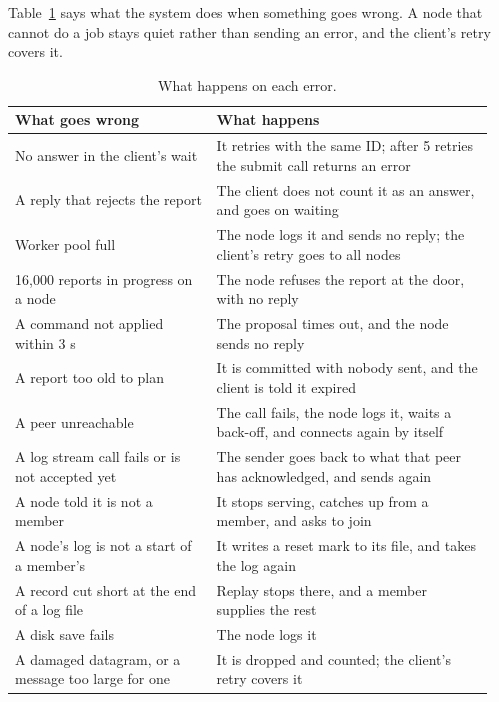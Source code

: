 Table~\ref{tab:errors} says what the system does when something goes wrong. A node that cannot do a job stays quiet rather than sending an error, and the client's retry covers it.

\begin{table}[!htb]
\centering\small
\caption{What happens on each error.}
\label{tab:errors}
\begin{tabular}{@{}p{0.40\linewidth}p{0.55\linewidth}@{}}
\toprule
What goes wrong & What happens \\
\midrule
No answer in the client's wait & It retries with the same ID; after 5 retries the submit call returns an error \\
A reply that rejects the report & The client does not count it as an answer, and goes on waiting \\
Worker pool full & The node logs it and sends no reply; the client's retry goes to all nodes \\
16,000 reports in progress on a node & The node refuses the report at the door, with no reply \\
A command not applied within 3 s & The proposal times out, and the node sends no reply \\
A report too old to plan & It is committed with nobody sent, and the client is told it expired \\
A peer unreachable & The call fails, the node logs it, waits a back-off, and connects again by itself \\
A log stream call fails or is not accepted yet & The sender goes back to what that peer has acknowledged, and sends again \\
A node told it is not a member & It stops serving, catches up from a member, and asks to join \\
A node's log is not a start of a member's & It writes a reset mark to its file, and takes the log again \\
A record cut short at the end of a log file & Replay stops there, and a member supplies the rest \\
A disk save fails & The node logs it \\
A damaged datagram, or a message too large for one & It is dropped and counted; the client's retry covers it \\
\bottomrule
\end{tabular}
\end{table}
